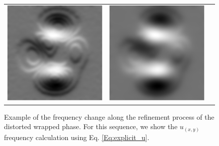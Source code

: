 \begin{figure}[Ht]
\begin{center}
\begin{tabular}{c c c}
      \includegraphics[scale=0.45]{Chpt4_figures/Fig_frecuencias2.eps}&
      \includegraphics[scale=0.45]{Chpt4_figures/Fig_frecuencias3.eps}\\
    \end{tabular}
  \end{center}
  \caption{Example of the frequency change along the refinement process of the 
  distorted wrapped phase. For this sequence, we show the $u_(x,y)$ frequency 
  calculation using Eq. \ref{Eq:explicit_u}.}
  \label{fig:frecuencias}
\end{figure}

